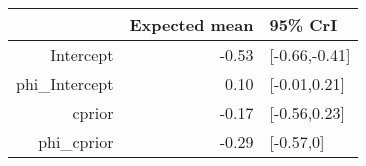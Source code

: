 \begin{tabular}{rrl}
  \hline
 & Expected mean & 95\% CrI \\ 
  \hline
Intercept & -0.53 & [-0.66,-0.41] \\ 
  phi\_Intercept & 0.10 & [-0.01,0.21] \\ 
  cprior & -0.17 & [-0.56,0.23] \\ 
  phi\_cprior & -0.29 & [-0.57,0] \\ 
   \hline
\end{tabular}


